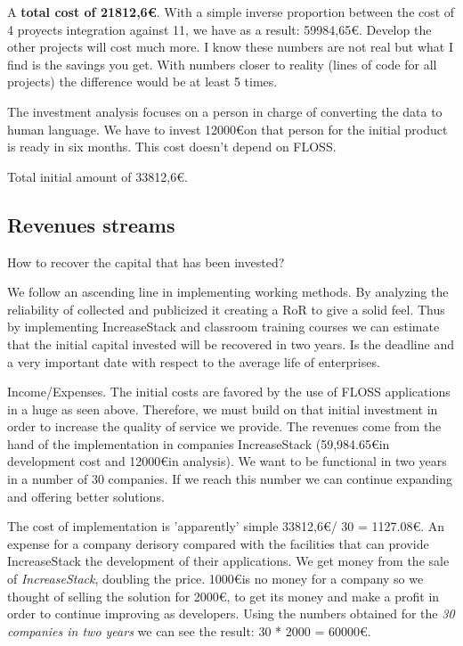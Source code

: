 \documentclass[11pt]{scrartcl}
\begin{document}
\par A \textbf{total cost of 21812,6\euro}. With a simple inverse proportion between the cost of 4 proyects integration against 11, we have as a result: 59984,65\euro. Develop the other projects will cost much more. I know these numbers are not real but what I find is the savings you get. With numbers closer to reality (lines of code for all projects) the difference would be at least 5 times.

\par The investment analysis focuses on a person in charge of converting the data to human language. We have to invest 12000\euro on that person for the initial product is ready in six months. This cost doesn't depend on FLOSS.

\par Total initial amount of 33812,6\euro.

\subsection{Revenues streams}

\par How to recover the capital that has been invested?

\par We follow an ascending line in implementing working methods. By analyzing the reliability of collected and publicized it creating a RoR to give a solid feel. Thus by implementing IncreaseStack and classroom training courses we can estimate that the initial capital invested will be recovered in two years. Is the deadline and a very important date with respect to the average life of enterprises.

\par Income/Expenses. The initial costs are favored by the use of FLOSS applications in a huge as seen above. Therefore, we must build on that initial investment in order to increase the quality of service we provide. The revenues come from the hand of the implementation in companies IncreaseStack (59,984.65\euro in development cost and 12000\euro in analysis). We want to be functional in two years in a number of 30 companies. If we reach this number we can continue expanding and offering better solutions.

\par The cost of implementation is 'apparently' simple 33812,6\euro / 30 = 1127.08\euro. An expense for a company derisory compared with the facilities that can provide IncreaseStack the development of their applications. We get money from the sale of \emph{IncreaseStack}, doubling the price. 1000\euro is no money for a company so we thought of selling the solution for 2000\euro, to get its money and make a profit in order to continue improving as developers. Using the numbers obtained for the \emph{30 companies in two years} we can see the result: 30 * 2000 = 60000\euro.
\end{document}
